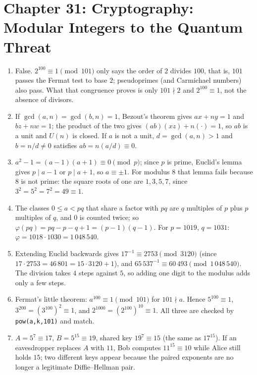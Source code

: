 \section*{Chapter 31: Cryptography: Modular Integers to the Quantum Threat}
\begin{enumerate}[label=\textbf{31.\arabic*}]
  \item False. $2^{100}\equiv1\pmod{101}$ only says the order of $2$ divides $100$,
        that is, $101$ passes the Fermat test to base $2$; pseudoprimes (and
        Carmichael numbers) also pass. What that congruence proves is only $101\nmid2$
        and $2^{100}\equiv1$, not the absence of divisors.

  \item If $\gcd(a,n)=\gcd(b,n)=1$, Bezout's theorem gives $ax+ny=1$ and
        $bz+nw=1$; the product of the two gives $(ab)(xz)+n(\cdot)=1$, so $ab$ is a unit
        and $U(n)$ is closed. If $a$ is not a unit, $d=\gcd(a,n)>1$ and
        $b=n/d\ne0$ satisfies $ab=n(a/d)\equiv0$.

  \item $a^{2}-1=(a-1)(a+1)\equiv0\pmod p$; since $p$ is prime, Euclid's lemma gives
        $p\mid a-1$ or $p\mid a+1$, so $a\equiv\pm1$. For modulus $8$ that lemma
        fails because $8$ is not prime: the square roots of one are $1,3,5,7$, since
        $3^{2}=5^{2}=7^{2}=49\equiv1$.

  \item The classes $0\le a<pq$ that share a factor with $pq$ are $q$ multiples of $p$
        plus $p$ multiples of $q$, and $0$ is counted twice; so
        $\varphi(pq)=pq-p-q+1=(p-1)(q-1)$. For $p=1019$, $q=1031$:
        $\varphi=1018\cdot1030=1\,048\,540$.

  \item Extending Euclid backwards gives $17^{-1}\equiv2753\pmod{3120}$ (since
        $17\cdot2753=46\,801=15\cdot3120+1$), and
        $65\,537^{-1}\equiv60\,493\pmod{1\,048\,540}$. The division takes $4$ steps against $5$,
        so adding one digit to the modulus adds only a few
        steps.

  \item Fermat's little theorem: $a^{100}\equiv1\pmod{101}$ for $101\nmid a$. Hence
        $5^{100}\equiv1$, $3^{200}=(3^{100})^{2}\equiv1$, and
        $2^{1000}=(2^{100})^{10}\equiv1$. All three are checked by
        \texttt{pow(a,k,101)} and match.

  \item $A=5^{7}\equiv17$, $B=5^{15}\equiv19$, shared key $19^{7}\equiv15$
        (the same as $17^{15}$). If an eavesdropper replaces $A$ with $11$, Bob
        computes $11^{15}\equiv10$ while Alice still holds $15$; two different
        keys appear because the paired exponents are no longer a legitimate
        Diffie--Hellman pair.


\end{enumerate}
